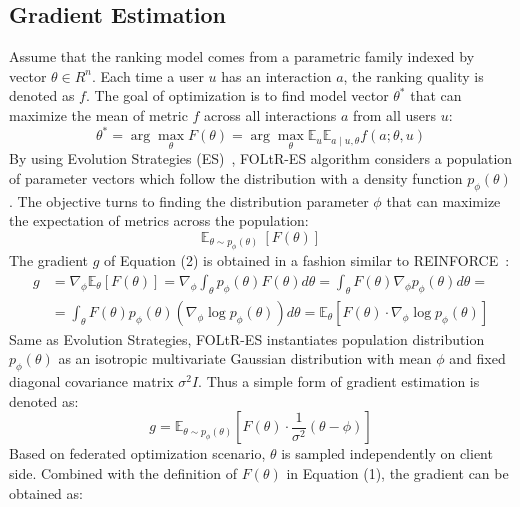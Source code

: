 \subsection{Gradient Estimation}
Assume that the ranking model comes from a parametric family indexed by vector $\theta \in R^{n}$. Each time a user $u$ has an interaction $a$, the ranking quality is denoted as $f$. The goal of optimization is to find model vector $\theta^*$ that can maximize the mean of metric $f$ across all interactions $a$ from all users $u$:
\begin{equation}
	\theta^{*}=\arg \max _{\theta} F(\theta)=\arg \max _{\theta} \mathbb{E}_{u} \mathbb{E}_{a \mid u, \theta} f(a ; \theta, u)
\end{equation}
By using Evolution Strategies (ES)~\cite{salimans2017evolution}, FOLtR-ES algorithm considers a population of parameter vectors which follow the distribution with a density function $p_{\phi}(\theta)$. The objective turns to finding the distribution parameter $\phi$ that can maximize the expectation of metrics across the population:
\begin{equation}
	 \mathbb{E}_{\theta\sim p_{\phi}(\theta)}~[F(\theta)]
\end{equation}
The gradient $g$ of Equation (2) is obtained in a fashion similar to REINFORCE~\cite{williams1992simple}:
\begin{equation}
	\begin{aligned}
		g &=\nabla_{\phi} \mathbb{E}_{\theta}[F(\theta)]=\nabla_{\phi} \int_{\theta} p_{\phi}(\theta) F(\theta) d \theta=\int_{\theta} F(\theta) \nabla_{\phi} p_{\phi}(\theta) d \theta=\\
		&=\int_{\theta} F(\theta) p_{\phi}(\theta)\left(\nabla_{\phi} \log p_{\phi}(\theta)\right) d \theta=\mathbb{E}_{\theta}\left[F(\theta) \cdot \nabla_{\phi} \log p_{\phi}(\theta)\right]
	\end{aligned}
\end{equation}
Same as Evolution Strategies, FOLtR-ES instantiates population distribution $p_{\phi}(\theta)$ as an isotropic multivariate Gaussian distribution with mean $\phi$ and fixed diagonal covariance matrix $\sigma^2I$. Thus a simple form of gradient estimation is denoted as:
\begin{equation}
	g=\mathbb{E}_{\theta \sim p_{\phi}(\theta)}\left[F(\theta) \cdot \frac{1}{\sigma^{2}}(\theta-\phi)\right]
\end{equation}
Based on federated optimization scenario, $\theta$ is sampled independently on client side. Combined with the definition of $F(\theta)$ in Equation (1), the gradient can be obtained as:
